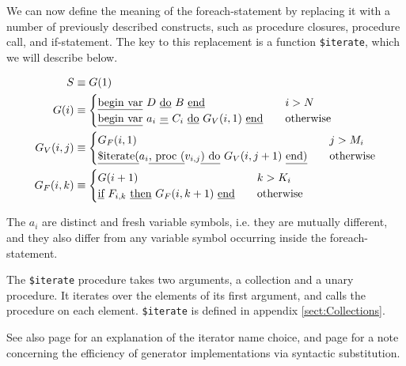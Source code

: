 We can now define the meaning of the foreach-statement by replacing it
with a
number of previously described constructs, such as procedure closures,
procedure call, and if-statement. The key to this replacement is a
function {\tt \$iterate}, which we will describe below.

\begin{align*}
  S & \equiv G(1) \\
  G(i) & \equiv 
  \begin{cases}
    \text{\underline{begin var}}~D~\text{\underline{do}}~B~\text{\underline{end}} &\quad i > N\\
    \text{\underline{begin var}}~a_i ~\text{\underline{=}} ~C_i ~\text{\underline{do}}~
    G_V(i, 1) ~\text{\underline{end}} &\quad \text{otherwise} 
  \end{cases}\\
  G_V(i, j) &\equiv
  \begin{cases}
    G_F(i, 1) &\quad j > M_i \\
    \text{\underline{\$iterate(}}a_i\text{\underline{, proc (}}v_{i, j}\text{\underline{) do}}~G_V(i, j +
    1)~\text{\underline{end)}} &\quad \text{otherwise}
  \end{cases}\\
  G_F(i, k) &\equiv
  \begin{cases}
    G(i+1) &\quad k > K_i\\
    \text{\underline{if}}~F_{i, k}~\text{\underline{then}}~G_F(i, k+1)~\text{\underline{end}} &\quad\text{otherwise}
  \end{cases}
\end{align*}

The $a_i$ are distinct and fresh variable symbols, i.e. they are
mutually different, and they also differ from any variable symbol
occurring inside the foreach-statement.

 The {\tt \$iterate}
procedure takes two arguments, a collection and a unary procedure. It
iterates over the elements of its first argument, and calls the
procedure on each element. {\tt \$iterate} is defined in appendix
\ref{sect:Collections}.

See also page \pageref{lbl:RationaleIteratorName} for an explanation
of the iterator name choice, and page
\pageref{lbl:GeneratorEfficiency} for a note concerning the efficiency
of generator implementations via syntactic substitution.

